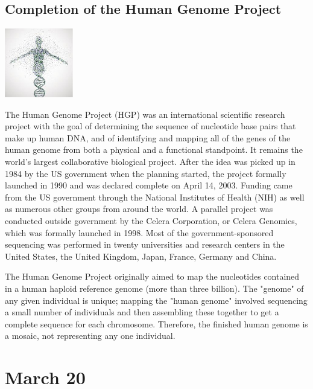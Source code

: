 \documentclass[11pt]{report}
\begin{document}
\subsection{Completion of the Human Genome Project}
\vspace{2mm}\begin{center}\includegraphics[width=3cm]{./img/HGP.jpg}\end{center}
The Human Genome Project (HGP) was an international scientific research project with the goal of determining the sequence of nucleotide base pairs that make up human DNA, and of identifying and mapping all of the genes of the human genome from both a physical and a functional standpoint. It remains the world's largest collaborative biological project. After the idea was picked up in 1984 by the US government when the planning started, the project formally launched in 1990 and was declared complete on April 14, 2003. Funding came from the US government through the National Institutes of Health (NIH) as well as numerous other groups from around the world. A parallel project was conducted outside government by the Celera Corporation, or Celera Genomics, which was formally launched in 1998. Most of the government-sponsored sequencing was performed in twenty universities and research centers in the United States, the United Kingdom, Japan, France, Germany and China.

The Human Genome Project originally aimed to map the nucleotides contained in a human haploid reference genome (more than three billion). The "genome" of any given individual is unique; mapping the "human genome" involved sequencing a small number of individuals and then assembling these together to get a complete sequence for each chromosome. Therefore, the finished human genome is a mosaic, not representing any one individual.

\section{March 20}
\end{document}
